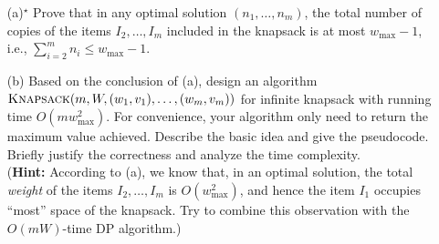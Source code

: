\documentclass[letterpaper, 11pt]{article}
\newcommand{\1}{\mathds{1}}	%
\theoremstyle{definition}
\begin{document}
\begin{enumerate}
    \item[(a)$^\star$] Prove that in any optimal solution $(n_1,\dots,n_m)$, the total number of copies of the items $I_2,\dots,I_m$ included in the knapsack is at most $w_{\max}-1$, i.e., $\sum_{i=2}^m n_i \leq w_{\max}-1$.
    \item[(b)] Based on the conclusion of (a), design an algorithm $\textsc{Knapsack}(m,W,(w_1,v_1),\dots,(w_m,v_m))$ for infinite knapsack with running time $O(mw_{\max}^2)$.
    For convenience, your algorithm only need to return the maximum value achieved.
    Describe the basic idea and give the pseudocode.
    Briefly justify the correctness and analyze the time complexity. \\[1ex]
    (\textbf{Hint:} According to (a), we know that, in an optimal solution, the total \textit{weight} of the items $I_2,\dots,I_m$ is $O(w_{\max}^2)$, and hence the item $I_1$ occupies ``most'' space of the knapsack. Try to combine this observation with the $O(mW)$-time DP algorithm.)
\end{enumerate}
\end{document}
